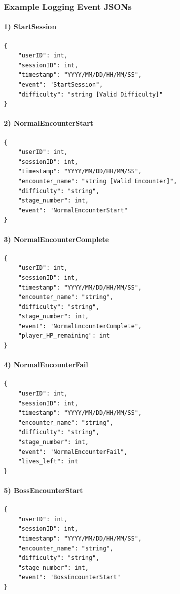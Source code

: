 \subsubsection{Example Logging Event JSONs}

\paragraph{1) StartSession}
\begin{verbatim}
{
    "userID": int,
    "sessionID": int,
    "timestamp": "YYYY/MM/DD/HH/MM/SS",
    "event": "StartSession",
    "difficulty": "string [Valid Difficulty]"
}
\end{verbatim}

\paragraph{2) NormalEncounterStart}
\begin{verbatim}
{
    "userID": int,
    "sessionID": int,
    "timestamp": "YYYY/MM/DD/HH/MM/SS",
    "encounter_name": "string [Valid Encounter]",
    "difficulty": "string",
    "stage_number": int,
    "event": "NormalEncounterStart"
}
\end{verbatim}

\paragraph{3) NormalEncounterComplete}
\begin{verbatim}
{
    "userID": int,
    "sessionID": int,
    "timestamp": "YYYY/MM/DD/HH/MM/SS",
    "encounter_name": "string",
    "difficulty": "string",
    "stage_number": int,
    "event": "NormalEncounterComplete",
    "player_HP_remaining": int
}
\end{verbatim}

\newpage
\paragraph{4) NormalEncounterFail}
\begin{verbatim}
{
    "userID": int,
    "sessionID": int,
    "timestamp": "YYYY/MM/DD/HH/MM/SS",
    "encounter_name": "string",
    "difficulty": "string",
    "stage_number": int,
    "event": "NormalEncounterFail",
    "lives_left": int
}
\end{verbatim}

\paragraph{5) BossEncounterStart}
\begin{verbatim}
{
    "userID": int,
    "sessionID": int,
    "timestamp": "YYYY/MM/DD/HH/MM/SS",
    "encounter_name": "string",
    "difficulty": "string",
    "stage_number": int,
    "event": "BossEncounterStart"
}
\end{verbatim}


